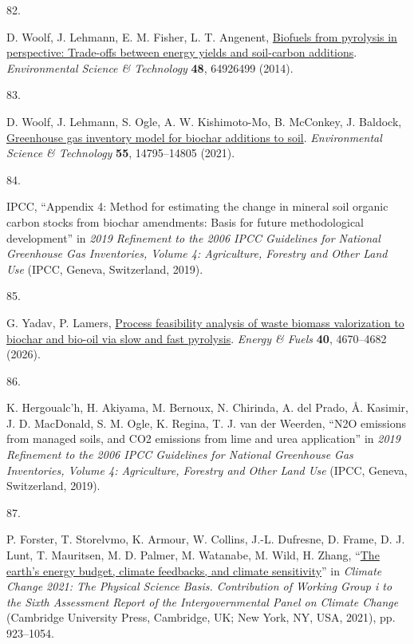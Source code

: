 \documentclass[
  letterpaper,
]{article}
\newlength{\cslhangindent}
\newlength{\csllabelwidth}
\newenvironment{CSLReferences}[2] %
 {\begin{list}{}{%
  \setlength{\itemindent}{0pt}
  \setlength{\leftmargin}{0pt}
  \setlength{\parsep}{0pt}
  \ifodd #1
   \setlength{\leftmargin}{\cslhangindent}
   \setlength{\itemindent}{-1\cslhangindent}
  \fi
  \setlength{\itemsep}{#2\baselineskip}}}
 {\end{list}}
\newcommand{\CSLLeftMargin}[1]{\parbox[t]{\csllabelwidth}{\strut#1\strut}}
\newcommand{\CSLRightInline}[1]{\parbox[t]{\linewidth - \csllabelwidth}{\strut#1\strut}}
\begin{document}
\begin{CSLReferences}{0}{1}
\CSLLeftMargin{82. }%
\CSLRightInline{D. Woolf, J. Lehmann, E. M. Fisher, L. T. Angenent,
\href{https://doi.org/10.1021/es500474q}{Biofuels from pyrolysis in
perspective: Trade-offs between energy yields and soil-carbon
additions}. \emph{Environmental Science \& Technology} \textbf{48},
64926499 (2014).}

\CSLLeftMargin{83. }%
\CSLRightInline{D. Woolf, J. Lehmann, S. Ogle, A. W. Kishimoto-Mo, B.
McConkey, J. Baldock,
\href{https://doi.org/10.1021/acs.est.1c02425}{Greenhouse gas inventory
model for biochar additions to soil}. \emph{Environmental Science \&
Technology} \textbf{55}, 14795--14805 (2021).}

\CSLLeftMargin{84. }%
\CSLRightInline{IPCC, {``Appendix 4: Method for estimating the change in
mineral soil organic carbon stocks from biochar amendments: Basis for
future methodological development''} in \emph{2019 Refinement to the
2006 {IPCC} Guidelines for National Greenhouse Gas Inventories, Volume
4: Agriculture, Forestry and Other Land Use} (IPCC, Geneva, Switzerland,
2019).}

\CSLLeftMargin{85. }%
\CSLRightInline{G. Yadav, P. Lamers,
\href{https://doi.org/10.1021/acs.energyfuels.5c05655}{Process
feasibility analysis of waste biomass valorization to biochar and
bio-oil via slow and fast pyrolysis}. \emph{Energy \& Fuels}
\textbf{40}, 4670--4682 (2026).}

\CSLLeftMargin{86. }%
\CSLRightInline{K. Hergoualc'h, H. Akiyama, M. Bernoux, N. Chirinda, A.
del Prado, Å. Kasimir, J. D. MacDonald, S. M. Ogle, K. Regina, T. J. van
der Weerden, {``{N2O} emissions from managed soils, and {CO2} emissions
from lime and urea application''} in \emph{2019 Refinement to the 2006
{IPCC} Guidelines for National Greenhouse Gas Inventories, Volume 4:
Agriculture, Forestry and Other Land Use} (IPCC, Geneva, Switzerland,
2019).}

\CSLLeftMargin{87. }%
\CSLRightInline{P. Forster, T. Storelvmo, K. Armour, W. Collins, J.-L.
Dufresne, D. Frame, D. J. Lunt, T. Mauritsen, M. D. Palmer, M. Watanabe,
M. Wild, H. Zhang,
{``\href{https://doi.org/10.1017/9781009157896.009}{The earth's energy
budget, climate feedbacks, and climate sensitivity}''} in \emph{Climate
Change 2021: The Physical Science Basis. Contribution of Working Group i
to the Sixth Assessment Report of the Intergovernmental Panel on Climate
Change} (Cambridge University Press, Cambridge, UK; New York, NY, USA,
2021), pp. 923--1054.}


\end{CSLReferences}
\end{document}
